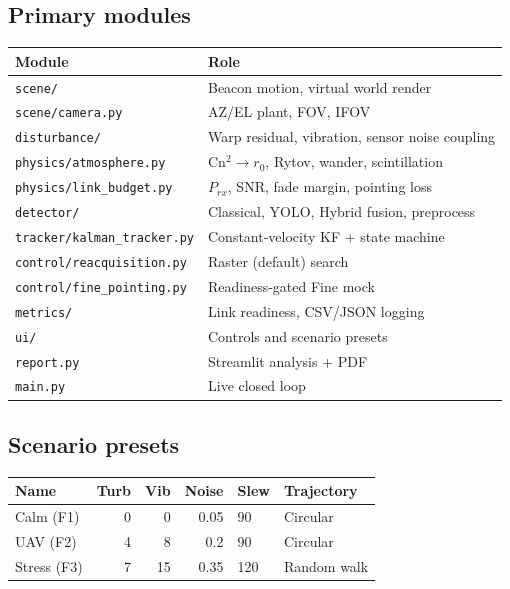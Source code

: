 \documentclass[11pt,a4paper]{article}
\begin{document}
\subsection{Primary modules}
\begin{center}
\begin{tabular}{@{}ll@{}}
\toprule
\textbf{Module} & \textbf{Role} \\
\midrule
\texttt{scene/} & Beacon motion, virtual world render \\
\texttt{scene/camera.py} & AZ/EL plant, FOV, IFOV \\
\texttt{disturbance/} & Warp residual, vibration, sensor noise coupling \\
\texttt{physics/atmosphere.py} & Cn$^2\rightarrow r_0$, Rytov, wander, scintillation \\
\texttt{physics/link\_budget.py} & $P_{rx}$, SNR, fade margin, pointing loss \\
\texttt{detector/} & Classical, YOLO, Hybrid fusion, preprocess \\
\texttt{tracker/kalman\_tracker.py} & Constant-velocity KF + state machine \\
\texttt{control/reacquisition.py} & Raster (default) search \\
\texttt{control/fine\_pointing.py} & Readiness-gated Fine mock \\
\texttt{metrics/} & Link readiness, CSV/JSON logging \\
\texttt{ui/} & Controls and scenario presets \\
\texttt{report.py} & Streamlit analysis + PDF \\
\texttt{main.py} & Live closed loop \\
\bottomrule
\end{tabular}
\end{center}

\subsection{Scenario presets}
\begin{center}
\begin{tabular}{@{}lrrrll@{}}
\toprule
\textbf{Name} & \textbf{Turb} & \textbf{Vib} & \textbf{Noise} & \textbf{Slew} & \textbf{Trajectory} \\
\midrule
Calm (F1) & 0 & 0 & 0.05 & 90 & Circular \\
UAV (F2) & 4 & 8 & 0.2 & 90 & Circular \\
Stress (F3) & 7 & 15 & 0.35 & 120 & Random walk \\
\bottomrule
\end{tabular}
\end{center}
\end{document}
